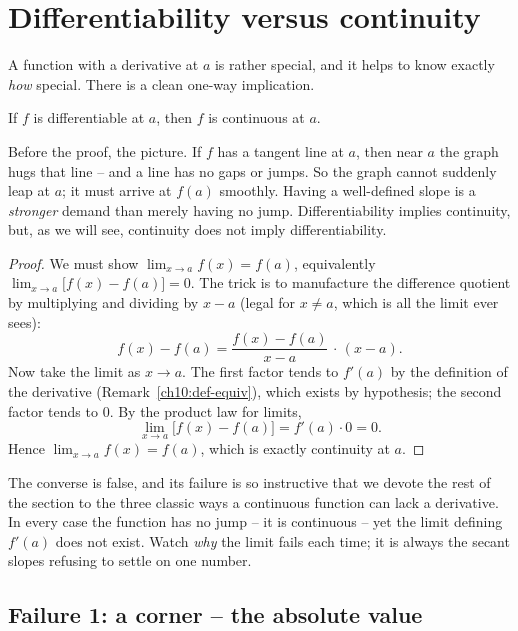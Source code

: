 \section{Differentiability versus continuity}
\label{ch10:diff-vs-cont}

A function with a derivative at $a$ is rather special, and it helps to know exactly
\emph{how} special. There is a clean one-way implication.

\begin{theorem}
\label{ch10:thm-diff-implies-cont}
If $f$ is differentiable at $a$, then $f$ is continuous at $a$.
\end{theorem}

\begin{intuitionbox}
Before the proof, the picture. If $f$ has a tangent line at $a$, then near $a$ the
graph hugs that line -- and a line has no gaps or jumps. So the graph cannot
suddenly leap at $a$; it must arrive at $f(a)$ smoothly. Having a well-defined
slope is a \emph{stronger} demand than merely having no jump. Differentiability
implies continuity, but, as we will see, continuity does not imply
differentiability.
\end{intuitionbox}

\begin{proof}
We must show $\displaystyle\lim_{x \to a} f(x) = f(a)$, equivalently
$\displaystyle\lim_{x \to a}\bigl[f(x) - f(a)\bigr] = 0$. The trick is to
manufacture the difference quotient by multiplying and dividing by $x - a$ (legal
for $x \neq a$, which is all the limit ever sees):
\[
  f(x) - f(a) = \frac{f(x) - f(a)}{x - a}\,\cdot\,(x - a).
\]
Now take the limit as $x \to a$. The first factor tends to $f'(a)$ by the
definition of the derivative (Remark~\ref{ch10:def-equiv}), which exists by
hypothesis; the second factor tends to $0$. By the product law for limits,
\[
  \lim_{x \to a}\bigl[f(x) - f(a)\bigr]
  = f'(a) \cdot 0 = 0.
\]
Hence $\lim_{x \to a} f(x) = f(a)$, which is exactly continuity at $a$.
\end{proof}

The converse is false, and its failure is so instructive that we devote the rest
of the section to the three classic ways a continuous function can lack a
derivative. In every case the function has no jump -- it is continuous -- yet the
limit defining $f'(a)$ does not exist. Watch \emph{why} the limit fails each time;
it is always the secant slopes refusing to settle on one number.

\subsection*{Failure 1: a corner -- the absolute value}


